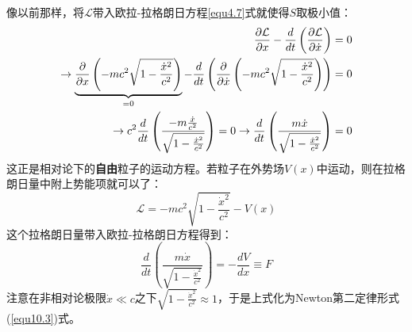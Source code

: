 像以前那样，将$\mathcal{L}$带入欧拉-拉格朗日方程\ref{equ4.7}式就使得$S$取极小值：
\begin{align}
    \frac{\partial \mathcal{L}}{\partial x} - \frac{d}{dt} \left( \frac{\partial \mathcal{L}}{\partial \dot{x}} \right) &= 0 \notag \\
    \to \underbrace{ \frac{\partial}{\partial x} \left( -mc^2 \sqrt{1 - \frac{\dot{x}^2}{c^2}} \right) }_{ = 0} - \frac{d}{dt} \left( \frac{\partial}{\partial \dot{x}} \left( -mc^2 \sqrt{1 - \frac{ \dot{x}^2}{c^2} } \right) \right) &= 0 \notag \\
\label{equ10.9}
    \to c^2 \frac{d}{dt} \left( \frac{ -m \frac{\dot{x}}{c^2} }{\sqrt{1 - \frac{ \dot{x}^2}{c^2} } } \right) = 0 \rightarrow \frac{d}{dt} \left( \frac{m \dot{x}}{\sqrt{1 - \frac{\dot{x}^2}{c^2}}} \right) &= 0
\end{align}
这正是相对论下的{\bf 自由}粒子的运动方程。若粒子在外势场$V(x)$中运动，则在拉格朗日量中附上势能项就可以了：
\begin{equation}
\label{equ10.10}
    \mathcal{L} = -mc^2 \sqrt{1 - \frac{\dot{x}^2}{c^2} } - V(x)
\end{equation}
这个拉格朗日量带入欧拉-拉格朗日方程得到：
\begin{equation}
\label{equ10.11}
    \frac{d}{dt} \left( \frac{m \dot{x}}{ \sqrt{1 - \frac{\dot{x}^2}{c^2} } } \right) = - \frac{dV}{dx} \equiv F
\end{equation}
注意在非相对论极限$\dot{x} \ll c$之下$\sqrt{1 - \frac{\dot{x}^2}{c^2} } \approx 1$，于是上式化为Newton第二定律形式(\ref{equ10.3})式。

